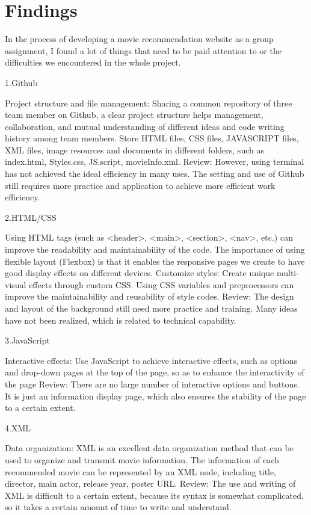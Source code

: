 \documentclass{article}
\begin{document}
\section{Findings}

In the process of developing a movie recommendation website as a group assignment, I found a lot of things that need to be paid attention to or the difficulties we encountered in the whole project.

1.Github

Project structure and file management: Sharing a common repository of three team member on Github, a clear project structure helps management, collaboration, and mutual understanding of different ideas and code writing history among team members. Store HTML files, CSS files, JAVASCRIPT files, XML files, image resources and documents in different folders, such as index.html, Styles.css, JS.script, movieInfo.xml.
Review: However, using terminal has not achieved the ideal efficiency in many uses. The setting and use of Github still requires more practice and application to achieve more efficient work efficiency.

2.HTML/CSS

Using HTML tags (such as <header>, <main>, <section>, <nav>, etc.) can improve the readability and maintainability of the code.
The importance of using flexible layout (Flexbox) is that it enables the responsive pages we create to have good display effects on different devices.
Customize styles: Create unique multi-visual effects through custom CSS. Using CSS variables and preprocessors can improve the maintainability and reusability of style codes.
Review: The design and layout of the background still need more practice and training. Many ideas have not been realized, which is related to technical capability.

3.JavaScript

Interactive effects: Use JavaScript to achieve interactive effects, such as options and drop-down pages at the top of the page, so as to enhance the interactivity of the page
Review: There are no large number of interactive options and buttons. It is just an information display page, which also ensures the stability of the page to a certain extent.

4.XML

Data organization: XML is an excellent data organization method that can be used to organize and transmit movie information. The information of each recommended movie can be represented by an XML node, including title, director, main actor, release year, poster URL.
Review: The use and writing of XML is difficult to a certain extent, because its syntax is somewhat complicated, so it takes a certain amount of time to write and understand.
\end{document}
